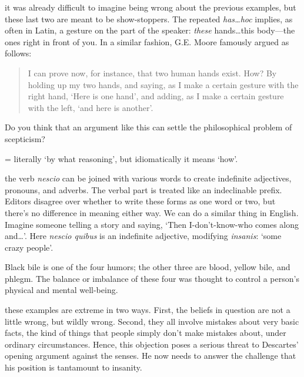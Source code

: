  it was already difficult to imagine being wrong about the previous examples, but these last two are meant to be show-stoppers. The repeated \textit{has\dots hoc} implies, as often in Latin, a gesture on the part of the speaker: \textit{these} hands\dots this body---the ones right in front of you. In a similar fashion, G.E. Moore \citep[165--166]{baldwin1993} famously argued as follows:
\begin{quote}
    I can prove now, for instance, that two human hands exist. How? By holding up my two hands, and saying, as I make a certain gesture with the right hand, `Here is one hand', and adding, as I make a certain gesture with the left, `and here is another'.
\end{quote}
Do you think that an argument like this can settle the philosophical problem of scepticism?

 = literally `by what reasoning', but idiomatically it means `how'.

 the verb \textit{nescio} can be joined with various words to create indefinite adjectives, pronouns, and adverbs. The verbal part is treated like an indeclinable prefix. Editors disagree over whether to write these forms as one word or two, but there's no difference in meaning either way. We can do a similar thing in English. Imagine someone telling a story and saying, `Then I-don't-know-who comes along and\dots'. Here \textit{nescio quibus} is an indefinite adjective, modifying \textit{insanis}: `some crazy people'.

 Black bile is one of the four humors; the other three are blood, yellow bile, and phlegm. The balance or imbalance of these four was thought to control a person's physical and mental well-being.

 these examples are extreme in two ways. First, the beliefs in question are not a little wrong, but wildly wrong. Second, they all involve mistakes about very basic facts, the kind of things that people simply don't make mistakes about, under ordinary circumstances. Hence, this objection poses a serious threat to Descartes' opening argument against the senses. He now needs to answer the challenge that his position is tantamount to insanity.

\clearpage

